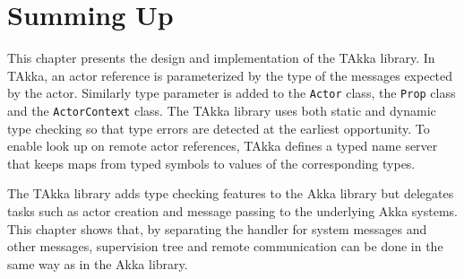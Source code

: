 \section{Summing Up}

This chapter presents the design and implementation of the TAkka library.
In TAkka, an actor reference is parameterized by the type of the messages 
expected by the actor.  Similarly type parameter is added to the {\tt Actor} 
class, the {\tt Prop} class and the {\tt ActorContext} class.  The TAkka 
library uses both static and dynamic type checking so that type errors are 
detected at the earliest opportunity.  To enable look up on remote actor 
references, TAkka defines a typed name server that keeps maps from typed 
symbols to values of the corresponding types.    

The TAkka library adds type checking features to the Akka library but delegates 
tasks such as actor creation and message passing to the underlying Akka 
systems.  This chapter shows that, by separating the handler for system 
messages and other messages, supervision tree and remote 
communication can be done in the same way as in the Akka library. 



